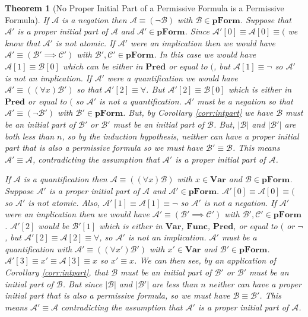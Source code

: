 \documentclass[12pt]{article}
\theoremstyle{break}
\theoremstyle{break}
\newtheorem{theorem}{Theorem}[section]
\theoremstyle{break}
\theoremstyle{break}
\newcommand{\mc}[1]{\mathcal{#1}}
\begin{document}
\begin{theorem}[No Proper Initial Part of a Permissive Formula is a Permissive Formula]
If $\mc{A}$ is a negation then $\mc{A} \equiv (\lnot \mc{B})$ with $\mc{B} \in \textbf{pForm}$.
Suppose that $\mc{A}'$ is a proper initial part of $\mc{A}$ and $\mc{A}'\in\textbf{pForm}$.
Since $\mc{A}'[0] \equiv \mc{A}[0] \equiv ($ we know that $\mc{A}'$ is not atomic.
If $\mc{A}'$ were an implication then we would have $\mc{A}' \equiv (\mc{B}' \implies \mc{C}')$ with $\mc{B}', \mc{C}' \in \textbf{pForm}$. 
In this case we would have $\mc{A}[1] \equiv \mc{B}[0]$ which can be either in $\textbf{Pred}$ or equal to $($, but $\mc{A}[1] \equiv \lnot$ so $\mc{A}'$ is not an implication.
If $\mc{A}'$ were a quantification we would have $\mc{A}' \equiv ((\forall x) \mc{B}')$ so that $\mc{A}'[2] \equiv \forall$. But $\mc{A}'[2] \equiv \mc{B}[0]$ which is either in $\textbf{Pred}$ or equal to $($ so $\mc{A}'$ is not a quantification.
$\mc{A}'$ must be a negation so that $\mc{A}' \equiv (\lnot \mc{B}')$ with $\mc{B}' \in \textbf{pForm}$.
But, by Corollary \ref{corr:intpart} we have $\mc{B}$ must be an initial part of $\mc{B}'$ or $\mc{B}'$ must be an initial part of $\mc{B}$.
But, $|\mc{B}|$ and $|\mc{B}'|$ are both less than $n$, so by the induction hypothesis, neither can have a proper initial part that is also a permissive formula so we must have $\mc{B}' \equiv \mc{B}$.
This means $\mc{A}' \equiv \mc{A}$, contradicting the assumption that $\mc{A}'$ is a proper initial part of $\mc{A}$.

If $\mc{A}$ is a quantification then $\mc{A} \equiv ((\forall x) \mc{B})$ with $x \in \textbf{Var}$ and $\mc{B} \in \textbf{pForm}$.
Suppose $\mc{A}'$ is a proper initial part of $\mc{A}$ and $\mc{A}' \in \textbf{pForm}$.
$\mc{A}'[0] \equiv \mc{A}[0] \equiv ($ so $\mc{A}'$ is not atomic.
Also, $\mc{A}'[1] \equiv \mc{A}[1] \equiv \lnot$ so $\mc{A}'$ is not a negation.
If $\mc{A}'$ were an implication then we would have $\mc{A}' \equiv (\mc{B}' \implies \mc{C}')$ with $\mc{B}', \mc{C}' \in \textbf{pForm}$.
$\mc{A}'[2]$ would be $\mc{B}'[1]$ which is either in $\textbf{Var}$, $\textbf{Func}$, $\textbf{Pred}$, or equal to $($ or $\lnot$, but $\mc{A}'[2] \equiv \mc{A}[2] \equiv \forall$, so $\mc{A}'$ is not an implication.
$\mc{A}'$ must be a quantification with $\mc{A}' \equiv ((\forall x') \mc{B}')$ with $x' \in \textbf{Var}$ and $\mc{B}' \in \textbf{pForm}$.
$\mc{A}'[3] \equiv x' \equiv \mc{A}[3] \equiv x$ so $x' \equiv x$.
We can then see, by an application of Corollary \ref{corr:intpart}, that $\mc{B}$ must be an initial part of $\mc{B}'$ or $\mc{B}'$ must be an initial part of $\mc{B}$.
But since $|\mc{B}|$ and $|\mc{B}'| $ are less than $n$ neither can have a proper initial part that is also a permissive formula, so we must have $\mc{B} \equiv \mc{B}'$.
This means $\mc{A}' \equiv \mc{A}$ contradicting the assumption that $\mc{A}'$ is a proper initial part of $\mc{A}$.
\end{theorem}
\end{document}
